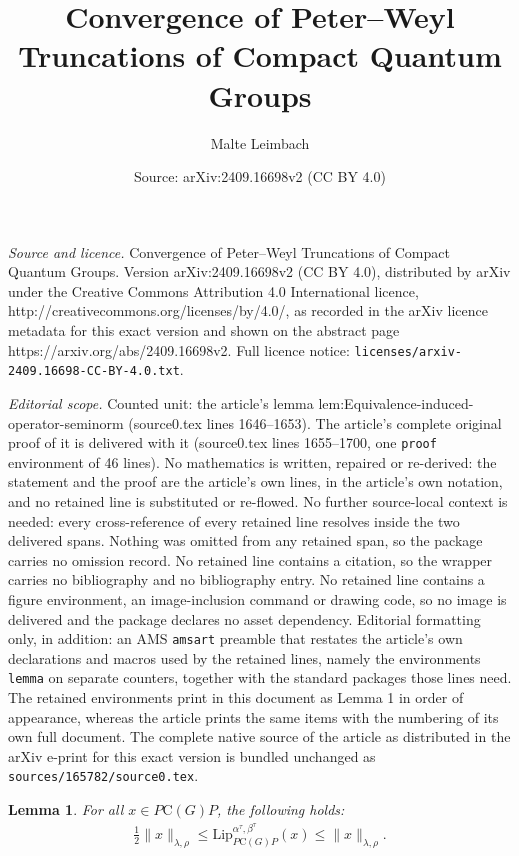 \documentclass[10pt,a4paper]{amsart}
\title{Convergence of Peter--Weyl Truncations of Compact Quantum Groups}
\author{Malte Leimbach}
\date{Source: arXiv:2409.16698v2 (CC BY 4.0)}
\newtheorem{lemma}{Lemma}
\begin{document}
\maketitle

\noindent\emph{Source and licence.} Convergence of Peter--Weyl Truncations of Compact Quantum Groups. Version arXiv:2409.16698v2 (CC BY 4.0), distributed by arXiv under the Creative Commons Attribution 4.0 International licence, http://creativecommons.org/licenses/by/4.0/, as recorded in the arXiv licence metadata for this exact version and shown on the abstract page https://arxiv.org/abs/2409.16698v2. Full licence notice: \texttt{licenses/arxiv-2409.16698-CC-BY-4.0.txt}.\par\smallskip

\noindent\textit{Editorial scope.} Counted unit: the article's lemma lem:Equivalence-induced-operator-seminorm (source0.tex lines 1646--1653). The article's complete original proof of it is delivered with it (source0.tex lines 1655--1700, one \texttt{proof} environment of 46 lines). No mathematics is written, repaired or re-derived: the statement and the proof are the article's own lines, in the article's own notation, and no retained line is substituted or re-flowed.  No further source-local context is needed: every cross-reference of every retained line resolves inside the two delivered spans.  Nothing was omitted from any retained span, so the package carries no omission record.  No retained line contains a citation, so the wrapper carries no bibliography and no bibliography entry.  No retained line contains a figure environment, an image-inclusion command or drawing code, so no image is delivered and the package declares no asset dependency.  Editorial formatting only, in addition: an AMS \texttt{amsart} preamble that restates the article's own declarations and macros used by the retained lines, namely the environments \texttt{lemma} on separate counters, together with the standard packages those lines need.  The retained environments print in this document as Lemma 1 in order of appearance, whereas the article prints the same items with the numbering of its own full document.  The complete native source of the article as distributed in the arXiv e-print for this exact version is bundled unchanged as \texttt{sources/165782/source0.tex}.
	\begin{lemma}\label{lem:Equivalence-induced-operator-seminorm}
		For all $x \in P\mathrm{C}(G)P$, the following holds:
		\begin{align}\label{eqn:equivalence-induced-and-left-seminorm}
			\frac{1}{2}\lVert x\rVert_{\lambda,\rho}
			\leq \mathrm{Lip}^{\alpha^\tau,\beta^\tau}_{P\mathrm{C}(G)P}(x)
			\leq \lVert x\rVert_{\lambda,\rho}.
		\end{align}
	\end{lemma}
\end{document}
